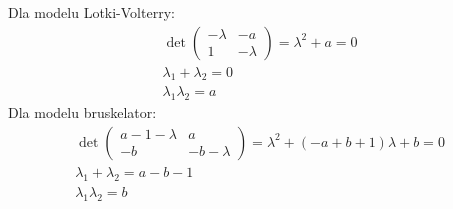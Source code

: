 \documentclass[10pt, a4paper, twoside, onecolumn]{article}
\numberwithin{equation}{section}
\begin{document}
	Dla modelu Lotki-Volterry:
	\begin{equation}\label{lotka_volterra_charakterystyczne}
	\begin{split}
		\det
		\begin{pmatrix}
			-\lambda & -a \\
			1 & -\lambda
		\end{pmatrix}
		=\lambda^{2}+a=0 \\
		\lambda_{1}+\lambda_{2}=0 \\
		\lambda_{1}\lambda_{2}=a
	\end{split}
	\end{equation}
	Dla modelu bruskelator:
	\begin{equation}\label{bruskelator_charakterystyczne}
	\begin{split}
		\det
		\begin{pmatrix}
			a-1-\lambda & a \\
			-b & -b-\lambda
		\end{pmatrix}
		=\lambda^{2}+(-a+b+1)\lambda+b=0 \\
		\lambda_{1}+\lambda_{2}=a-b-1 \\
		\lambda_{1}\lambda_{2}=b
	\end{split}
	\end{equation}
	
\end{document}

